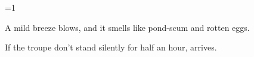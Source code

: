 \ifnum\value{cycle}=1

\begin{boxtext}
  A mild breeze blows, and it smells like pond-scum and rotten eggs.
\end{boxtext}

If the troupe don't stand silently for half an hour,  arrives.

\basilisk

\fi
